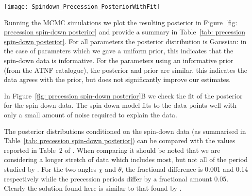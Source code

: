 \documentclass[../full_thesis/full_thesis.tex]{subfiles}
\newcommand{\thisdir}{../comparing_periodic_modulations}
\begin{document}
\begin{figure*}
\centering
\texttt{[image: Spindown\_Precession\_PosteriorWithFit]}
\caption{$\textbf{A}$: The estimated marginal posterior probability distribution for the
precession spin-down model parameters. For the secular spin-down
quantities, we show the difference with respect to the values as listed in
Table~\ref{tab: ATNF}.
$\textbf{B}$: Checking the fit of the model using the
maximum posterior values to the data; see Figure~\ref{fig: noise-only beam-width
posterior fit} for a complete description.}
\label{fig: precession spin-down posterior}
\end{figure*}
Running the MCMC simulations we plot the resulting
posterior in Figure~\ref{fig: precession spin-down posterior} and provide a
summary in Table~\ref{tab: precession spin-down posterior}. For all parameters
the posterior distribution is Gaussian: in the case of parameters which we gave
a uniform prior, this indicates that the spin-down data is informative. For the
parameters using an informative prior (from the ATNF catalogue), the posterior
and prior are similar, this indicates the data agrees with the prior, but does
not significantly improve our estimates.
\begin{table}[htb]
\small
\centering
\caption{Posterior estimates for the spin-down precession model. For the secular spin-down
quantities, we report the posterior difference with respect to the values as listed in
Table~\ref{tab: ATNF}.}
\label{tab: precession spin-down posterior}

\end{table}

In Figure~\ref{fig: precession spin-down posterior}B we check the fit of the
posterior for the spin-down data. The spin-down model fits to the data points
well with only a small amount of noise required to explain the data.

The posterior distributions conditioned on the spin-down data (as summarised in
Table~\ref{tab: precession spin-down posterior}) can be compared with the
values reported in Table~2 of \citet{Link2001}. When comparing it should be
noted that we are considering a longer stretch of data which includes most, but
not all of the period studied by \citet{Link2001}. For the two angles $\chi$
and $\theta$, the fractional difference is 0.001 and 0.14 respectively while
the precession periods differ by a fractional amount 0.05. Clearly the solution found here
is similar to that found by \citet{Link2001}.
\end{document}
